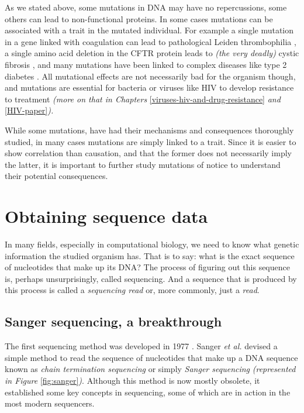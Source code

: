 \documentclass[
  11pt,
  twoside,
  BCOR=10mm,
  listof=totoc]{scrbook}
\begin{document}
As we stated above, some mutations in DNA may have no repercussions, some others can lead to non-functional proteins. In some cases mutations can be associated with a trait in the mutated individual. For example a single mutation in a gene linked with coagulation can lead to pathological Leiden thrombophilia \autocite{kujovichFactorLeidenThrombophilia2011}, a single amino acid deletion in the CFTR protein leads to \emph{(the very deadly)} cystic fibrosis \autocite{cuttingCysticFibrosisGenetics2015}, and many mutations have been linked to complex diseases like type 2 diabetes \autocite{fuchsbergerGeneticArchitectureType2016,morrisLargescaleAssociationAnalysis2012}. All mutational effects are not necessarily bad for the organism though, and mutations are essential for bacteria \autocite{woodfordEmergenceAntibioticResistance2007} or viruses like HIV \autocite{rheeHumanImmunodeficiencyVirus2003} to develop resistance to treatment \emph{(more on that in Chapters} \ref{viruses-hiv-and-drug-resistance} \emph{and} \ref{HIV-paper}\emph{).}

While some mutations, have had their mechanisms and consequences thoroughly studied, in many cases mutations are simply linked to a trait. Since it is easier to show correlation than causation, and that the former does not necessarily imply the latter, it is important to further study mutations of notice to understand their potential consequences.

\hypertarget{obtaining-sequence-data}{%
\section{Obtaining sequence data}\label{obtaining-sequence-data}}

In many fields, especially in computational biology, we need to know what genetic information the studied organism has. That is to say: what is the exact sequence of nucleotides that make up its DNA? The process of figuring out this sequence is, perhaps unsurprisingly, called sequencing. And a sequence that is produced by this process is called a \emph{sequencing read} or, more commonly, just a \emph{read}.

\hypertarget{sanger-sequencing-a-breakthrough}{%
\subsection{Sanger sequencing, a breakthrough}\label{sanger-sequencing-a-breakthrough}}

The first sequencing method was developed in 1977 \autocite{sangerDNASequencingChainterminating1977}. Sanger \emph{et al.} devised a simple method to read the sequence of nucleotides that make up a DNA sequence known as \emph{chain termination sequencing} or simply \emph{Sanger sequencing} \emph{(represented in Figure} \ref{fig:sanger}\emph{)}. Although this method is now mostly obsolete, it established some key concepts in sequencing, some of which are in action in the most modern sequencers.
\end{document}
